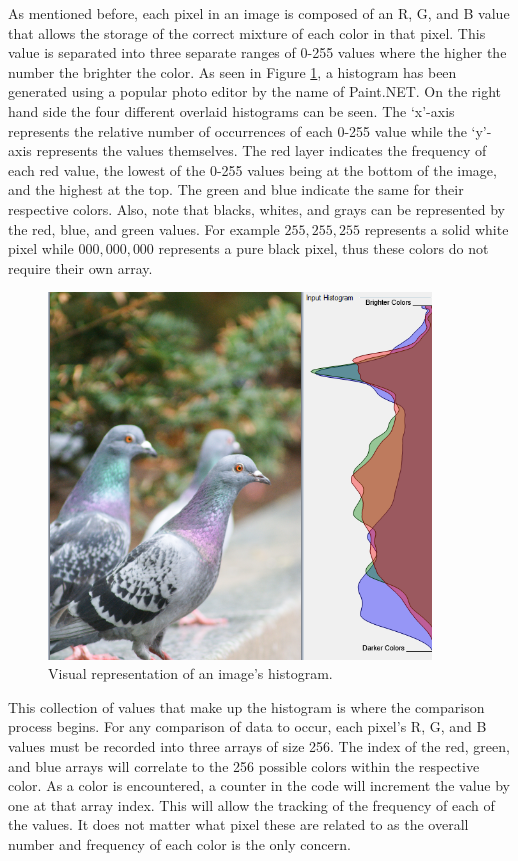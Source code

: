As mentioned before, each pixel in an image is composed of an R, G, and B value that allows the storage of the correct mixture of each color in that pixel. This value is separated into three separate ranges of 0-255 values where the higher the number the brighter the color. As seen in Figure \ref{historep}, a histogram has been generated using a popular photo editor by the name of Paint.NET. On the right hand side the four different overlaid histograms can be seen. The `x'-axis represents the relative number of occurrences of each 0-255 value while the `y'-axis represents the values themselves. The red layer indicates the frequency of each red value, the lowest of the 0-255 values being at the bottom of the image, and the highest at the top. The green and blue indicate the same for their respective colors. Also, note that blacks, whites, and grays can be represented by the red, blue, and green values. For example $255,255,255$ represents a solid white pixel while $000,000,000$ represents a pure black pixel, thus these colors do not require their own array.

\begin{figure}[htbp]
\centering
\includegraphics[width=4in]{historep}
\caption{Visual representation of an image's histogram.}
\label{historep}
\end{figure}

This collection of values that make up the histogram is where the comparison process begins. For any comparison of data to occur, each pixel's R, G, and B values must be recorded into three arrays of size 256. The index of the red, green, and blue arrays will correlate to the 256 possible colors within the respective color. As a color is encountered, a counter in the code will increment the value by one at that array index. This will allow the tracking of the frequency of each of the values. It does not matter what pixel these are related to as the overall number and frequency of each color is the only concern.

